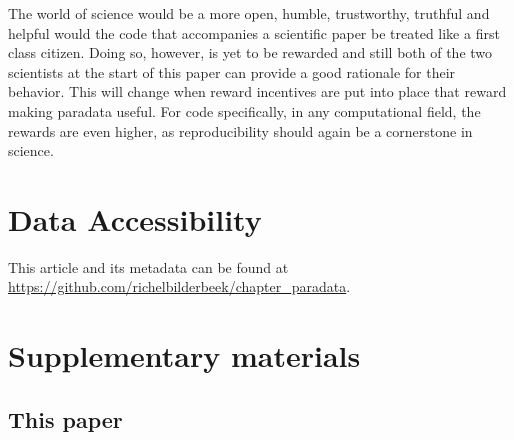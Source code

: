 
The world of science would be a more open, humble, trustworthy, truthful
and helpful would the code that accompanies a scientific paper
be treated like a first class citizen. 
Doing so, however, is yet to be rewarded
and still both of the two scientists at the start of this paper 
can provide a good rationale for their behavior.
This will change when reward incentives are put into place 
that reward making paradata useful.
For code specifically, in any computational field,
the rewards are even higher, as reproducibility should again be 
a cornerstone in science.

\section{Data Accessibility}

This article and its metadata can be found at 
\url{https://github.com/richelbilderbeek/chapter_paradata}.




\newpage
\appendix
\section{Supplementary materials}

\renewcommand{\thefigure}{S\arabic{figure}}
\setcounter{figure}{0}

\renewcommand{\thetable}{S\arabic{table}}
\setcounter{table}{0}

\subsection{This paper}

